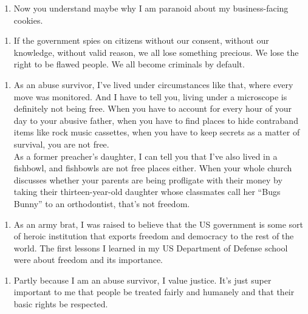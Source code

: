 \begin{enumerate}
\def\labelenumi{\arabic{enumi}.}
\setcounter{enumi}{7}
\tightlist
\item
  Now you understand maybe why I am paranoid about my business-facing
  cookies.
\end{enumerate}

\begin{enumerate}
\def\labelenumi{\arabic{enumi}.}
\setcounter{enumi}{8}
\tightlist
\item
  If the government spies on citizens without our consent, without our
  knowledge, without valid reason, we all lose something precious. We
  lose the right to be flawed people. We all become criminals by
  default.
\end{enumerate}

\begin{enumerate}
\def\labelenumi{\arabic{enumi}.}
\setcounter{enumi}{9}
\tightlist
\item
  As an abuse survivor, I've lived under circumstances like that, where
  every move was monitored. And I have to tell you, living under a
  microscope is definitely not being free. When you have to account for
  every hour of your day to your abusive father, when you have to find
  places to hide contraband items like rock music cassettes, when you
  have to keep secrets as a matter of survival, you are not free.\\

  As a former preacher's daughter, I can tell you that I've also lived in
  a fishbowl, and fishbowls are not free places either. When your whole
  church discusses whether your parents are being profligate with their
  money by taking their thirteen-year-old daughter whose classmates call
  her ``Bugs Bunny'' to an orthodontist, that's not freedom.
\end{enumerate}

\begin{enumerate}
\def\labelenumi{\arabic{enumi}.}
\setcounter{enumi}{10}
\tightlist
\item
  As an army brat, I was raised to believe that the US government is
  some sort of heroic institution that exports freedom and democracy to
  the rest of the world. The first lessons I learned in my US Department
  of Defense school were about freedom and its importance.
\end{enumerate}

\begin{enumerate}
\def\labelenumi{\arabic{enumi}.}
\setcounter{enumi}{11}
\tightlist
\item
  Partly because I am an abuse survivor, I value justice. It's just
  super important to me that people be treated fairly and humanely and
  that their basic rights be respected.
\end{enumerate}

